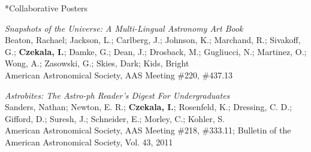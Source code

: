 \documentclass[10pt]{article}
\makeatletter
\renewcommand{\section}{\@startsection{section}{1}{0pt}{-\baselineskip}{0.5\baselineskip}{\scshape\color{myblue1}}}
\makeatother
\begin{document}
\section*{Collaborative Posters}
\begin{etaremune}
\item \emph{Snapshots of the Universe: A Multi-Lingual Astronomy Art Book}\\
Beaton, Rachael; Jackson, L.; Carlberg, J.; Johnson, K.; Marchand, R.; Sivakoff, G.; \textbf{Czekala, I.}; Damke, G.; Dean, J.; Drosback, M.; Gugliucci, N.; Martinez, O.; Wong, A.; Zasowski, G.; Skies, Dark; Kids, Bright\\
American Astronomical Society, AAS Meeting \#220, \#437.13
\item \emph{Astrobites: The Astro-ph Reader's Digest For Undergraduates}\\
Sanders, Nathan; Newton, E. R.; \textbf{Czekala, I.}; Rosenfeld, K.; Dressing, C. D.; Gifford, D.; Suresh, J.; Schneider, E.; Morley, C.; Kohler, S.\\
American Astronomical Society, AAS Meeting \#218, \#333.11; Bulletin of the American Astronomical Society, Vol. 43, 2011
\end{etaremune}
\end{document}
